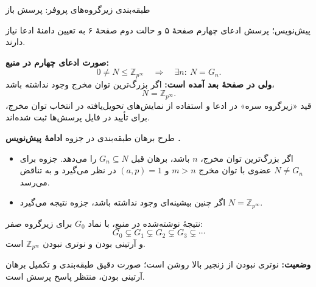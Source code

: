 \begin{frame}[t]{طبقه‌بندی زیرگروه‌های پروفر: پرسش باز}
    \label{lec10:prufer-classification-question}
    \begin{tblock}{پیش‌نویس؛ پرسش }
        ادعای چهارم صفحهٔ ۵ و حالت دوم صفحهٔ ۶ به تعیین دامنهٔ ادعا نیاز دارند.
    \end{tblock}
    \textbf{صورت ادعای چهارم در منبع:}
    \[
        0\ne N\leq\mathbb Z_{p^\infty}
        \quad\Longrightarrow\quad
        \exists n:\ N=G_n.
    \]
    \textbf{ولی در صفحهٔ بعد آمده است:}
    اگر بزرگ‌ترین توان مخرج وجود نداشته باشد،
    \[
        N=\mathbb Z_{p^\infty}.
    \]
    قید «زیرگروه سره» در ادعا و استفاده از نمایش‌های تحویل‌یافته
    در انتخاب توان مخرج، برای تأیید در فایل پرسش‌ها ثبت شده‌اند.
\end{frame}

\begin{frame}[t]{طرح برهان طبقه‌بندی در جزوه}
    \label{lec10:prufer-classification-outline}
    \textbf{ادامهٔ پیش‌نویس .}
    \begin{itemize}
        \item اگر بزرگ‌ترین توان مخرج، $n$ باشد، برهان قبل $G_n\subseteq N$
              را می‌دهد. جزوه برای $N\ne G_n$ عضوی با توان مخرج $m>n$
              و $(a,p)=1$ در نظر می‌گیرد و به تناقض می‌رسد.
        \item اگر چنین بیشینه‌ای وجود نداشته باشد،
              جزوه نتیجه می‌گیرد $N=\mathbb Z_{p^\infty}$.
    \end{itemize}
    نتیجهٔ نوشته‌شده در منبع، با نماد $G_0$ برای زیرگروه صفر:
    \[
        G_0\subsetneq G_1\subsetneq G_2\subsetneq G_3\subsetneq\cdots
    \]
    و آرتینی بودن و نوتری نبودن $\mathbb Z_{p^\infty}$ است.

    \textbf{وضعیت:} نوتری نبودن از زنجیر بالا روشن است؛
    صورت دقیق طبقه‌بندی و تکمیل برهان آرتینی بودن، منتظر پاسخ پرسش است.
\end{frame}

